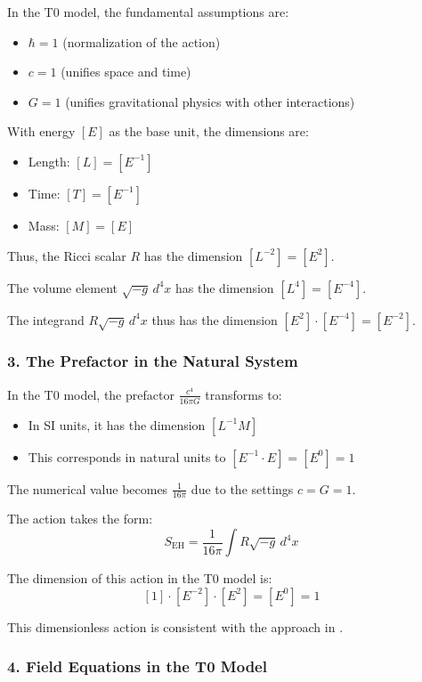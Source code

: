\documentclass[12pt,a4paper]{article}
\begin{document}
	In the T0 model, the fundamental assumptions are:
	\begin{itemize}
		\item $\hbar = 1$ (normalization of the action)
		\item $c = 1$ (unifies space and time)
		\item $G = 1$ (unifies gravitational physics with other interactions)
	\end{itemize}
	
	With energy $[E]$ as the base unit, the dimensions are:
	\begin{itemize}
		\item Length: $[L] = [E^{-1}]$
		\item Time: $[T] = [E^{-1}]$
		\item Mass: $[M] = [E]$
	\end{itemize}
	
	Thus, the Ricci scalar $R$ has the dimension $[L^{-2}] = [E^2]$.
	
	The volume element $\sqrt{-g} \, d^4x$ has the dimension $[L^4] = [E^{-4}]$.
	
	The integrand $R\sqrt{-g} \, d^4x$ thus has the dimension $[E^2] \cdot [E^{-4}] = [E^{-2}]$.
	
	\subsubsection*{3. The Prefactor in the Natural System}
	
	In the T0 model, the prefactor $\frac{c^4}{16\pi G}$ transforms to:
	\begin{itemize}
		\item In SI units, it has the dimension $[L^{-1} M]$
		\item This corresponds in natural units to $[E^{-1} \cdot E] = [E^0] = 1$
	\end{itemize}
	
	The numerical value becomes $\frac{1}{16\pi}$ due to the settings $c = G = 1$.
	
	The action takes the form:
	\[
	S_{\mathrm{EH}} = \frac{1}{16\pi} \int R \sqrt{-g} \, d^4x
	\]
	
	The dimension of this action in the T0 model is:
	\[
	[1] \cdot [E^{-2}] \cdot [E^2] = [E^0] = 1
	\]
	
	This dimensionless action is consistent with the approach in \cite{pascher_emergente_gravitation_2025}.
	
	\subsubsection*{4. Field Equations in the T0 Model}
	
\end{document}
